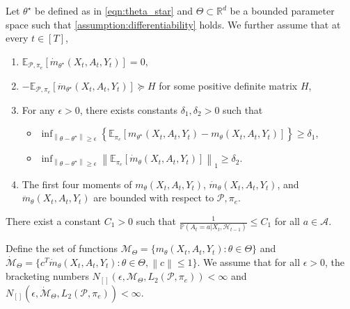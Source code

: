 \documentclass[10pt,a4paper]{amsart}
\newcommand{\E}{\mathbb{E}}
\newcommand{\R}{\mathbb{R}}
\newcommand{\norm}[1]{\left\lVert#1\right\rVert}
\begin{document}
\begin{assumption} \label{assumption:maximum}
Let $\theta^{\star}$ be defined as in \cref{eqn:theta_star} and $\Theta \subset \R^{d}$ be a bounded parameter space such that \cref{assumption:differentiability} holds. We further assume that at every $t \in [T]$,
\begin{enumerate}
\item $\E_{\mathcal{P},\pi_{e}}\left[ \dot{m}_{\theta^{\star}}(X_{t},A_{t},Y_{t})\right] =0,$  
\item $-\E_{\mathcal{P},\pi_{e}}\left[ \ddot{m}_{\theta^{\star}}(X_{t},A_{t},Y_{t}) \right] \succeq H  $ for some positive definite matrix $H$,
\item For any $\epsilon> 0 $, there exists constants $\delta_1,\delta_2 > 0 $ such that 
\begin{itemize}
    \item $\inf_{\norm{\theta- \theta^{\star}} \ge \epsilon} \left\{ \mathbb{E}_{\pi_{e}}\left[ m_{\theta^{\star}}(X_{t},A_t,Y_t) - m_{\theta}(X_{t},A_t,Y_t) \right]  \right\} \ge \delta_1$,
    \item  $\inf_{\norm{\theta- \theta^{\star}} \ge \epsilon} \norm{\mathbb{E}_{\pi_{e}}\left[\dot{m}_{\theta}(X_{t},A_t,Y_t)\right]}_{1}  \ge \delta_2$.
\end{itemize}
\item The first four moments of $m_{\theta}(X_t,A_t,Y_t)$,  $\dot{m}_{\theta}(X_t,A_t,Y_t)$, and $\ddot{m}_{\theta}(X_t,A_t,Y_t)$ are bounded with respect to $\mathcal{P},\pi_{e}$. 
\end{enumerate}
\end{assumption}

\begin{assumption} \label{assumption:bounded_importance}
There exist a constant $C_{1}> 0$ such that  $ \frac{1}{ \mathbb{P} \left(A_{t}=a| X_{t}, \mathcal{H}_{t-1} \right) } \le C_{1}$ for all $a\in \mathcal{A}$. 
\end{assumption}

\begin{assumption} \label{assumption:bracket3}
Define the set of functions
$ \mathcal{M}_{\Theta} =  \{ m_{\theta}(X_t,A_{t},Y_{t}) : \theta \in \Theta  \}$ and
$ \dot{\mathcal{M}}_{\Theta} =  \{c^{T}\dot{m}_{\theta}(X_t,A_{t},Y_{t}) : \theta \in \Theta , \norm{c} \le 1 \}$. We assume that for all $\epsilon>0$, the bracketing numbers  $N_{[]}(\epsilon, \mathcal{M}_{\Theta}, L_{2}(\mathcal{P},\pi_{e})) < \infty$ and $N_{[]}(\epsilon, \dot{\mathcal{M}}_{\Theta}, L_{2}(\mathcal{P},\pi_{e})) < \infty$. 


\end{assumption}
\end{document}
